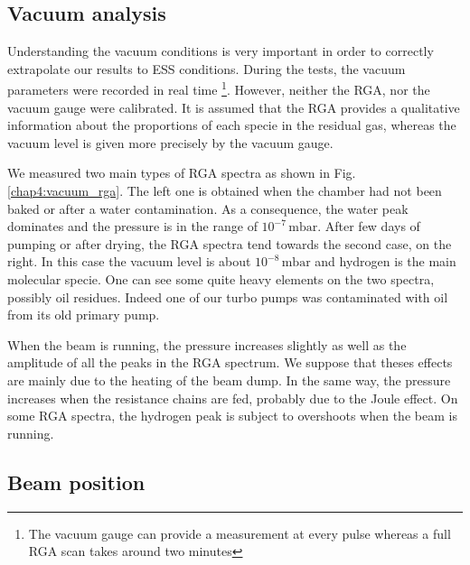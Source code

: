 \begin{refsection}
  \subsection{Vacuum analysis}
  \label{sec4:vacuum}
  Understanding the vacuum conditions is very important in order to correctly extrapolate our results to ESS conditions. During the tests, the vacuum parameters were recorded in real time \footnote{The vacuum gauge can provide a measurement at every pulse whereas a full RGA scan takes around two minutes}. However, neither the RGA, nor the vacuum gauge were calibrated. It is assumed that the RGA provides a qualitative information about the proportions of each specie in the residual gas, whereas the vacuum level is given more precisely by the vacuum gauge.

  We measured two main types of RGA spectra as shown in Fig. \ref{chap4:vacuum_rga}. The left one is obtained when the chamber had not been baked or after a water contamination. As a consequence, the water peak dominates and the pressure is in the range of $10^{-7}\,\mathrm{mbar}$. After few days of pumping or after drying, the RGA spectra tend towards the second case, on the right. In this case the vacuum level is about $10^{-8}\,\mathrm{mbar}$ and hydrogen is the main molecular specie. One can see some quite heavy elements on the two spectra, possibly oil residues. Indeed one of our turbo pumps was contaminated with oil from its old primary pump.

  

  When the beam is running, the pressure increases slightly as well as the amplitude of all the peaks in the RGA spectrum. We suppose that theses effects are mainly due to the heating of the beam dump. In the same way, the pressure increases when the resistance chains are fed, probably due to the Joule effect. On some RGA spectra, the hydrogen peak is subject to overshoots when the beam is running.

  \subsection{Beam position}
  \label{chap4:sec:Position}


\end{refsection}
